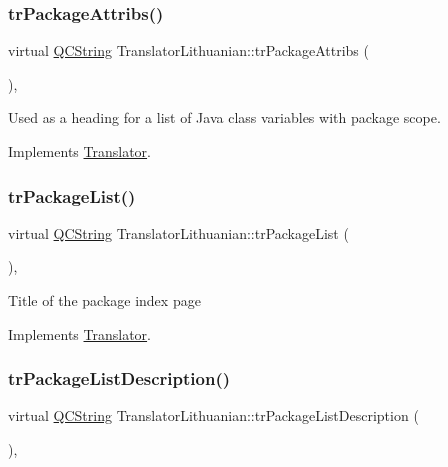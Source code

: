\subsubsection{\texorpdfstring{trPackageAttribs()}{trPackageAttribs()}}
{\footnotesize\ttfamily virtual \mbox{\hyperlink{class_q_c_string}{Q\+C\+String}} Translator\+Lithuanian\+::tr\+Package\+Attribs (\begin{DoxyParamCaption}{ }\end{DoxyParamCaption})\hspace{0.3cm}{\ttfamily [inline]}, {\ttfamily [virtual]}}

Used as a heading for a list of Java class variables with package scope. 

Implements \mbox{\hyperlink{class_translator}{Translator}}.

\mbox{\label{class_translator_lithuanian_a80e632fd9046db8f33dbd2b24c91a501}} 
\subsubsection{\texorpdfstring{trPackageList()}{trPackageList()}}
{\footnotesize\ttfamily virtual \mbox{\hyperlink{class_q_c_string}{Q\+C\+String}} Translator\+Lithuanian\+::tr\+Package\+List (\begin{DoxyParamCaption}{ }\end{DoxyParamCaption})\hspace{0.3cm}{\ttfamily [inline]}, {\ttfamily [virtual]}}

Title of the package index page 

Implements \mbox{\hyperlink{class_translator}{Translator}}.

\mbox{\label{class_translator_lithuanian_afaec054e27951bc49b1724285cc385f1}} 
\subsubsection{\texorpdfstring{trPackageListDescription()}{trPackageListDescription()}}
{\footnotesize\ttfamily virtual \mbox{\hyperlink{class_q_c_string}{Q\+C\+String}} Translator\+Lithuanian\+::tr\+Package\+List\+Description (\begin{DoxyParamCaption}{ }\end{DoxyParamCaption})\hspace{0.3cm}{\ttfamily [inline]}, {\ttfamily [virtual]}}

